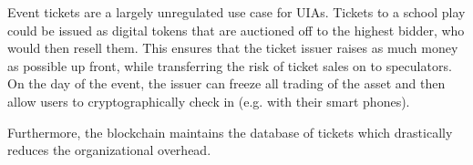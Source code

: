 Event tickets are a largely unregulated use case for UIAs. Tickets to a school
play could be issued as digital tokens that are auctioned off to the highest
bidder, who would then resell them. This ensures that the ticket issuer raises
as much money as possible up front, while transferring the risk of ticket sales
on to speculators. On the day of the event, the issuer can freeze all trading
of the asset and then allow users to cryptographically check in (e.g. with
their smart phones).

Furthermore, the blockchain maintains the database of tickets which drastically
reduces the organizational overhead.
